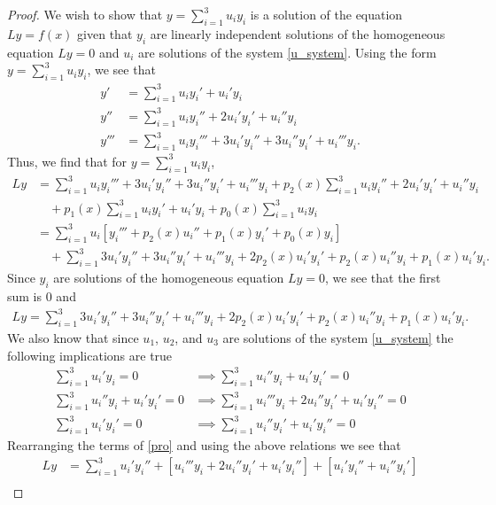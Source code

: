 \documentclass[12pt]{article}
\theoremstyle{definition}
\begin{document}
\begin{proof}
  We wish to show that $y = \sum_{i=1}^3 u_i y_i$ is a solution of the equation
  $Ly = f(x)$ given that $y_i$ are linearly independent solutions of the homogeneous
  equation $Ly = 0$ and $u_i$ are solutions of the system \eqref{u_system}.
  Using the form $y = \sum_{i=1}^3 u_i y_i$, we see that
  \begin{align*}
    y' &= \sum_{i=1}^3 u_i y_i' + u_i' y_i \\
    y'' &= \sum_{i=1}^3 u_i y_i'' + 2u_i'y_i' + u_i'' y_i \\
    y''' &= \sum_{i=1}^3 u_i y_i''' + 3u_i'y_i'' + 3u_i''y_i' + u_i''' y_i.
  \end{align*}
  Thus, we find that for $y = \sum_{i=1}^3 u_i y_i$,
  \begin{align*}
    Ly &= \sum_{i=1}^3 u_i y_i''' + 3u_i'y_i'' + 3u_i''y_i' + u_i''' y_i
    + p_2(x)\sum_{i=1}^3 u_i y_i'' + 2u_i'y_i' + u_i'' y_i \\
    &\quad + p_1(x)\sum_{i=1}^3 u_i y_i' + u_i' y_i
    + p_0(x)\sum_{i=1}^3 u_i y_i \\
    &= \sum_{i=1}^3 u_i[y_i''' + p_2(x)u_i'' + p_1(x)y_i' + p_0(x)y_i] \\
    &\quad + \sum_{i=1}^3 3u_i'y_i'' + 3u_i''y_i' + u_i'''y_i + 2p_2(x)u_i'y_i' + p_2(x)u_i''y_i + p_1(x)u_i'y_i.
  \end{align*}
  Since $y_i$ are solutions of the homogeneous equation $Ly = 0$, we see that the first sum is 0 and
  \begin{align}\label{pro}
    Ly = \sum_{i=1}^3 3u_i'y_i'' + 3u_i''y_i' + u_i'''y_i + 2p_2(x)u_i'y_i' + p_2(x)u_i''y_i + p_1(x)u_i'y_i.
  \end{align}
  We also know that since $u_1$, $u_2$, and $u_3$ are solutions of the system \eqref{u_system} the following implications are true
  \begin{align*}
    \sum_{i=1}^3 u_i'y_i = 0 &\implies \sum_{i=1}^3 u_i''y_i + u_i'y_i' = 0 \\
    \sum_{i=1}^3 u_i''y_i + u_i'y_i' = 0 &\implies \sum_{i=1}^3 u_i'''y_i + 2u_i''y_i' + u_i'y_i'' = 0 \\
    \sum_{i=1}^3 u_i'y_i' = 0 &\implies \sum_{i=1}^3 u_i''y_i' + u_i'y_i'' = 0
  \end{align*}
  Rearranging the terms of \eqref{pro} and using the above relations we see that
  \begin{align*}
    Ly &= \sum_{i=1}^3 u_i' y_i'' + [u_i'''y_i + 2u_i''y_i' + u_i'y_i''] + [u_i'y_i'' + u_i''y_i'] \\

\end{align*}
\end{proof}
\end{document}
